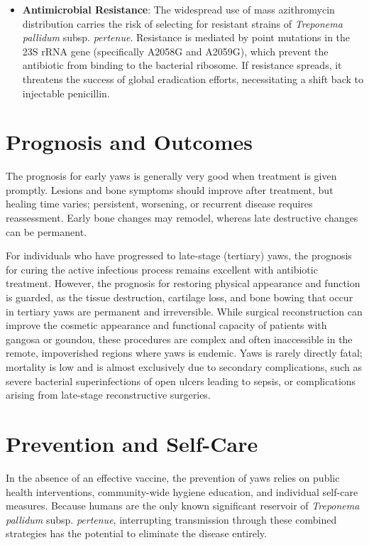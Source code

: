 \begin{itemize}
    \item \textbf{Antimicrobial Resistance}: The widespread use of mass azithromycin distribution carries the risk of selecting for resistant strains of \textit{Treponema pallidum} subsp. \textit{pertenue}. Resistance is mediated by point mutations in the 23S rRNA gene (specifically A2058G and A2059G), which prevent the antibiotic from binding to the bacterial ribosome. If resistance spreads, it threatens the success of global eradication efforts, necessitating a shift back to injectable penicillin.
\end{itemize}

\section*{Prognosis and Outcomes}
The prognosis for early yaws is generally very good when treatment is given promptly. Lesions and bone symptoms should improve after treatment, but healing time varies; persistent, worsening, or recurrent disease requires reassessment. Early bone changes may remodel, whereas late destructive changes can be permanent.

For individuals who have progressed to late-stage (tertiary) yaws, the prognosis for curing the active infectious process remains excellent with antibiotic treatment. However, the prognosis for restoring physical appearance and function is guarded, as the tissue destruction, cartilage loss, and bone bowing that occur in tertiary yaws are permanent and irreversible. While surgical reconstruction can improve the cosmetic appearance and functional capacity of patients with gangosa or goundou, these procedures are complex and often inaccessible in the remote, impoverished regions where yaws is endemic. Yaws is rarely directly fatal; mortality is low and is almost exclusively due to secondary complications, such as severe bacterial superinfections of open ulcers leading to sepsis, or complications arising from late-stage reconstructive surgeries.

\section*{Prevention and Self-Care}
In the absence of an effective vaccine, the prevention of yaws relies on public health interventions, community-wide hygiene education, and individual self-care measures. Because humans are the only known significant reservoir of \textit{Treponema pallidum} subsp. \textit{pertenue}, interrupting transmission through these combined strategies has the potential to eliminate the disease entirely.

